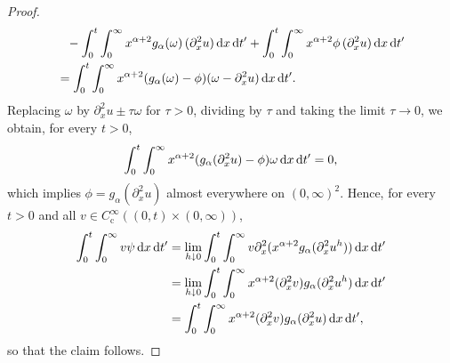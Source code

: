 \documentclass[reqno,12pt]{amsart}
\renewcommand{\d}{\ensuremath{\mathrm{d}}}
\renewcommand{\d}{\ensuremath{{\rm d}}}
\numberwithin{equation}{section}
\begin{document}
\begin{proof}
\begin{align*}
& \phantom{=} - \int_0^t \int_0^\infty x^{\alpha+2} g_\alpha(\omega) \, (\partial_x^2 u) \, \d x \, \d t' + \int_0^t \int_0^\infty x^{\alpha+2} \phi \, (\partial_x^2 u) \, \d x \, \d t' \\
&= \int_0^t \int_0^\infty x^{\alpha+2} (g_\alpha(\omega) - \phi) (\omega - \partial_x^2 u) \, \d x \, \d t'.
\end{align*}
%
Replacing $\omega$ by $\partial_x^2 u \pm \tau \omega$ for $\tau > 0$, dividing by $\tau$ and taking the limit $\tau \to 0$, we obtain, for every $t>0$,
%
\[
\int_0^t \int_0^\infty x^{\alpha+2} (g_\alpha(\partial_x^2 u) - \phi) \omega \, \d x \, \d t' = 0,
\]
%
which implies $\phi = g_\alpha(\partial_x^2 u)$ almost everywhere on $(0,\infty)^2$. Hence, for every $t > 0$ and all $v \in C^\infty_\mathrm{c}((0,t) \times (0,\infty))$,
%
\begin{align*}
\int_0^t \int_0^\infty v \psi \, \d x \, \d t' &= \lim_{h \downarrow 0} \int_0^t \int_0^\infty v \partial_x^2(x^{\alpha+2} g_\alpha(\partial_x^2 u^h)) \, \d x \, \d t' \\
&= \lim_{h \downarrow 0} \int_0^t \int_0^\infty x^{\alpha+2} (\partial_x^2 v) g_\alpha(\partial_x^2 u^h) \, \d x \, \d t' \\
&= \int_0^t \int_0^\infty x^{\alpha+2} (\partial_x^2 v) g_\alpha(\partial_x^2 u) \, \d x \, \d t',
\end{align*}
%
so that the claim follows.

%
\bigskip
%


\end{proof}
\end{document}
